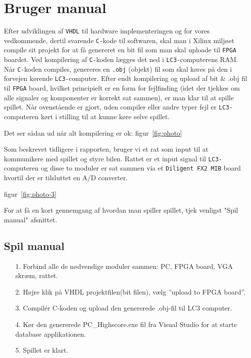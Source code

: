 \section{Bruger manual}
Efter udviklingen af \texttt{VHDL} til hardware implementeringen og for vores vedkommende, dertil svarende \texttt{C-}kode til softwaren, skal man i Xilinx miljøet compile sit projekt for at få genereret en bit fil som man skal uploade til \texttt{FPGA} boardet. Ved kompilering af \texttt{C-}koden lægges det ned i \texttt{LC3-}computerens RAM. Når \texttt{C-}koden compiles, genereres en \texttt{.obj} (objekt) fil som skal køres på den i forvejen kørende \texttt{LC3-}computer.
Efter endt kompilering og upload af bit & .obj fil til \texttt{FPGA} board, hvilket principielt er en form for fejlfinding (idet der tjekkes om alle signaler og komponenter er korrekt sat sammen), er man klar til at spille spillet. Når ovenstående er gjort, uden compiler eller andre typer fejl er \texttt{LC3-}computeren kørt i stilling til at kunne køre selve spillet.

Det ser sådan ud når alt kompilering er ok:
figur~\vref{fig:photo}

Som beskrevet tidligere i rapporten, bruger vi et rat som input til at kommunikere med spillet og styre bilen. Rattet er et input signal til \texttt{LC3-}computeren og disse to moduler er sat sammen via et \texttt{Diligent FX2 MIB} board hvortil der er tilsluttet en A/D converter. 

figur~\vref{fig:photo-3}

For at få en kort gennemgang af hvordan man spiller spillet, tjek venligst "Spil manual" afsnittet. 


\subsection{Spil manual}
\begin{enumerate}
\item[1. Forbind alle de nødvendige moduler sammen: PC, FPGA board, VGA skræm, rattet.]
\item[2. Højre klik på VHDL projektfilen(bit filen), vælg ”upload to FPGA board”.]
\item[3. Compilér C-koden og upload den genererede .obj-fil til LC3 computer.]
\item[4. Kør den genererede PC_Highscore.exe fil fra Visual Studio for at starte database applikationen.]
\item[5. Spillet er klart.]
\end{enumerate}

